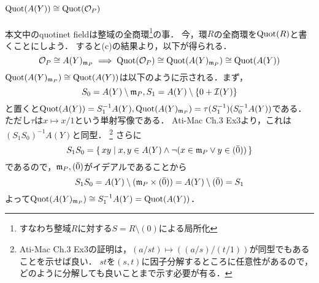 \documentclass[a4paper]{jarticle}
\begin{document}
    \paragraph{$\operatorname{Quot}(A(Y)) \cong \operatorname{Quot}(\mathcal{O}_P)$}
    本文中のquotinet fieldは整域の全商環\footnote{すなわち整域$R$に対する$S=R \setminus (0)$による局所化}の事．
    今，環$R$の全商環を$\operatorname{Quot}(R)$と書くことにしよう．
    すると(c)の結果より，以下が得られる．
    \[ \mathcal{O}_P \cong A(Y)_{\mathfrak{m}_P} \implies \operatorname{Quot}(\mathcal{O}_P) \cong \operatorname{Quot}(A(Y)_{\mathfrak{m}_P}) \cong \operatorname{Quot}(A(Y)) \]
    $\operatorname{Quot}(A(Y)_{\mathfrak{m}_P}) \cong \operatorname{Quot}(A(Y))$は以下のように示される．まず，
    \[ S_0=A(Y) \setminus \mathfrak{m}_P, S_1=A(Y) \setminus \{0+\mathcal{I}(Y) \} \]
    と置くと$\operatorname{Quot}(A(Y))=S_1^{-1}A(Y), \operatorname{Quot}(A(Y)_{\mathfrak{m}_P})=\tau(S_1^{-1})(S_0^{-1}A(Y))$である．
    ただし$\tau$は$x \mapsto x/1$という単射写像である．
    Ati-Mac Ch.3 Ex3より，これは$(S_1 S_0)^{-1}A(Y)$と同型．
    \footnote
    {
        Ati-Mac Ch.3 Ex3の証明は，$(a/st) \mapsto ((a/s)/(t/1))$が同型でもあることを示せば良い．
        $st$を$(s,t)$に因子分解するところに任意性があるので，どのように分解しても良いことまで示す必要が有る．
    }
    さらに
    \[ S_1 S_0=\set{ xy | x,y \in A(Y) \land \lnot(x \in \mathfrak{m}_P \lor y \in (\bar{0})) } \]
    であるので，$\mathfrak{m}_P, (\bar{0})$がイデアルであることから
    \[ S_1 S_0=A(Y) \setminus (\mathfrak{m}_P \times (\bar{0}))=A(Y) \setminus (\bar{0})=S_1 \]
    よって$\operatorname{Quot}(A(Y)_{\mathfrak{m}_P}) \cong S_1^{-1}A(Y)=\operatorname{Quot}(A(Y))$．
\end{document}
